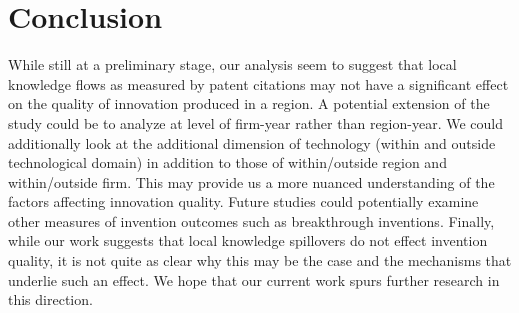 \documentclass[10pt,letterpaper]{article}
\begin{document}
\section*{Conclusion}
While still at a preliminary stage, our analysis seem to suggest that local knowledge flows as measured by patent citations may not have a significant effect on the quality of innovation produced in a region. A potential extension of the study could be to analyze at level of firm-year rather than region-year. We could additionally look at the additional dimension of technology (within and outside technological domain) in addition to those of within/outside region and within/outside firm. This may provide us a more nuanced understanding of the factors affecting innovation quality. Future studies could potentially examine other measures of invention outcomes such as breakthrough inventions. Finally, while our work suggests that local knowledge spillovers do not effect invention quality, it is not quite as clear why this may be the case and the mechanisms that underlie such an effect. We hope that our current work spurs further research in this direction.  

\begin{landscape}
\begin{centering}

\end{centering}
\end{landscape}

 

\end{document}

